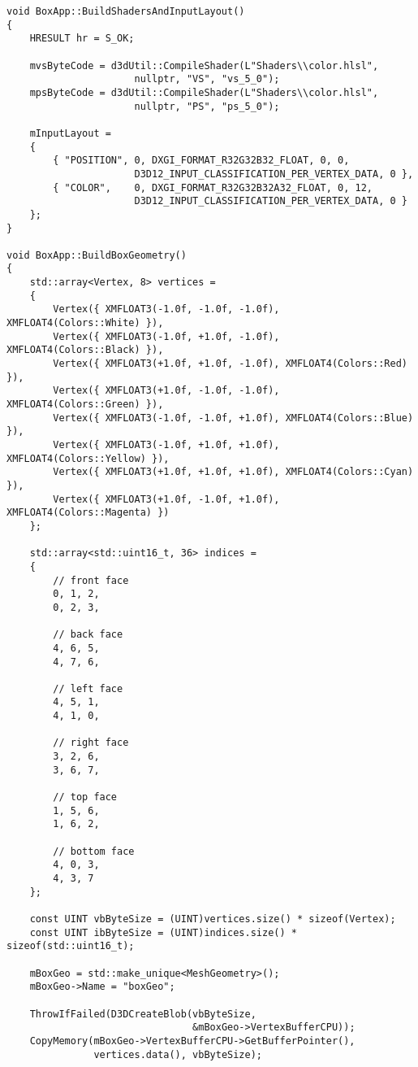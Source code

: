 \begin{lstlisting}
void BoxApp::BuildShadersAndInputLayout()
{
    HRESULT hr = S_OK;
    
    mvsByteCode = d3dUtil::CompileShader(L"Shaders\\color.hlsl", 
                      nullptr, "VS", "vs_5_0");
    mpsByteCode = d3dUtil::CompileShader(L"Shaders\\color.hlsl", 
                      nullptr, "PS", "ps_5_0");

    mInputLayout =
    {
        { "POSITION", 0, DXGI_FORMAT_R32G32B32_FLOAT, 0, 0, 
                      D3D12_INPUT_CLASSIFICATION_PER_VERTEX_DATA, 0 },
        { "COLOR",    0, DXGI_FORMAT_R32G32B32A32_FLOAT, 0, 12, 
                      D3D12_INPUT_CLASSIFICATION_PER_VERTEX_DATA, 0 }
    };
}

void BoxApp::BuildBoxGeometry()
{
    std::array<Vertex, 8> vertices =
    {
        Vertex({ XMFLOAT3(-1.0f, -1.0f, -1.0f), XMFLOAT4(Colors::White) }),
        Vertex({ XMFLOAT3(-1.0f, +1.0f, -1.0f), XMFLOAT4(Colors::Black) }),
        Vertex({ XMFLOAT3(+1.0f, +1.0f, -1.0f), XMFLOAT4(Colors::Red) }),
        Vertex({ XMFLOAT3(+1.0f, -1.0f, -1.0f), XMFLOAT4(Colors::Green) }),
        Vertex({ XMFLOAT3(-1.0f, -1.0f, +1.0f), XMFLOAT4(Colors::Blue) }),
        Vertex({ XMFLOAT3(-1.0f, +1.0f, +1.0f), XMFLOAT4(Colors::Yellow) }),
        Vertex({ XMFLOAT3(+1.0f, +1.0f, +1.0f), XMFLOAT4(Colors::Cyan) }),
        Vertex({ XMFLOAT3(+1.0f, -1.0f, +1.0f), XMFLOAT4(Colors::Magenta) })
    };

    std::array<std::uint16_t, 36> indices =
    {
        // front face
        0, 1, 2,
        0, 2, 3,

        // back face
        4, 6, 5,
        4, 7, 6,

        // left face
        4, 5, 1,
        4, 1, 0,

        // right face
        3, 2, 6,
        3, 6, 7,

        // top face
        1, 5, 6,
        1, 6, 2,

        // bottom face
        4, 0, 3,
        4, 3, 7
    };

    const UINT vbByteSize = (UINT)vertices.size() * sizeof(Vertex);
    const UINT ibByteSize = (UINT)indices.size() * sizeof(std::uint16_t);

    mBoxGeo = std::make_unique<MeshGeometry>();
    mBoxGeo->Name = "boxGeo";

    ThrowIfFailed(D3DCreateBlob(vbByteSize, 
                                &mBoxGeo->VertexBufferCPU));
    CopyMemory(mBoxGeo->VertexBufferCPU->GetBufferPointer(),
               vertices.data(), vbByteSize);


\end{lstlisting}
